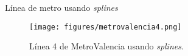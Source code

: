 \begin{frame}{Línea de metro usando \textit{splines}}
  \begin{figure}
    \centering
    \texttt{[image: figures/metrovalencia4.png]}
    \caption{Línea 4 de MetroValencia usando \textit{splines}.}
  \end{figure}
\end{frame}
